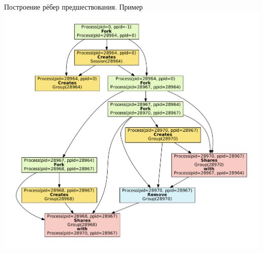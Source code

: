 \begin{frame}{Построение рёбер предшествования. Пример}
\centering
\includegraphics[scale=0.3]{fig/simpleGroupsGraphEdges.pdf}
\end{frame}


